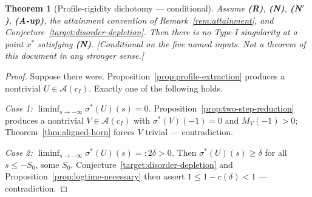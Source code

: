 \documentclass[11pt]{article}
\newtheorem{theorem}{Theorem}[section]
\theoremstyle{definition}
\theoremstyle{remark}
\begin{document}
\begin{theorem}[Profile-rigidity dichotomy --- conditional]
  \label{thm:rigidity-dichotomy}
  Assume \textbf{(R)}, \textbf{(N)}, \textbf{(N$'$)}, \textbf{(A-up)}, the
  attainment convention of Remark~\ref{rem:attainment}, and
  Conjecture~\ref{target:disorder-depletion}. Then there is no Type-I
  singularity at a point $x^*$ satisfying \textbf{(N)}.
  \emph{[Conditional on the five named inputs. Not a theorem of this
  document in any stronger sense.]}
\end{theorem}
\begin{proof}
  Suppose there were. Proposition~\ref{prop:profile-extraction} produces a
  nontrivial $U\in\mathcal{A}(c_I)$. Exactly one of the following holds.

  \emph{Case 1: $\liminf_{s\to-\infty}\sigma^*(U)(s)=0$.}
  Proposition~\ref{prop:two-step-reduction} produces a nontrivial
  $V\in\mathcal{A}(c_I)$ with $\sigma^*(V)(-1)=0$ and $M_V(-1)>0$;
  Theorem~\ref{thm:aligned-horn} forces $V$ trivial --- contradiction.

  \emph{Case 2: $\liminf_{s\to-\infty}\sigma^*(U)(s)=:2\delta>0$.} Then
  $\sigma^*(U)(s)\geq\delta$ for all $s\leq-S_0$, some $S_0$.
  Conjecture~\ref{target:disorder-depletion} and
  Proposition~\ref{prop:logtime-necessary} then assert
  $1\leq 1-c(\delta)<1$ --- contradiction.
\end{proof}
\end{document}

